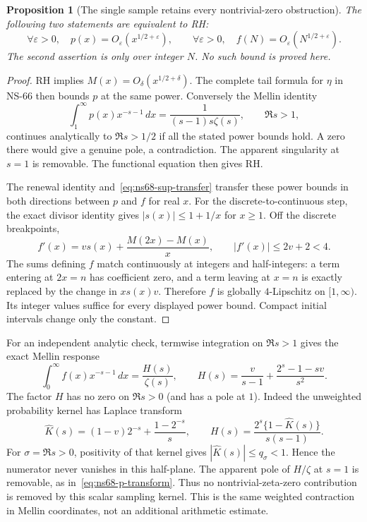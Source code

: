 \documentclass[11pt]{article}
\newtheorem{proposition}[theorem]{Proposition}
\theoremstyle{remark}
\begin{document}
\begin{proposition}[The single sample retains every nontrivial-zero obstruction]
\label{prop:ns68-scalar-criterion}
The following two statements are equivalent to RH:
\[
 \forall\varepsilon>0,\quad p(x)=O_\varepsilon(x^{1/2+\varepsilon}),
 \qquad
 \forall\varepsilon>0,\quad f(N)=O_\varepsilon(N^{1/2+\varepsilon}).
\]
The second assertion is only over integer $N$. No such bound is
proved here.
\end{proposition}
\begin{proof}
RH implies $M(x)=O_\delta(x^{1/2+\delta})$. The complete tail
formula for $\eta$ in NS-66 then bounds $p$ at the same power.
Conversely the Mellin identity
\begin{equation}
 \int_1^\infty p(x)x^{-s-1}\,dx
             =\frac1{(s-1)s\zeta(s)},\qquad \Re s>1,
 \label{eq:ns68-p-transform}
\end{equation}
continues analytically to $\Re s>1/2$ if all the stated power bounds
hold. A zero there would give a genuine pole, a contradiction.
The apparent singularity at $s=1$ is removable. The functional equation
then gives RH.

The renewal identity and~\eqref{eq:ns68-sup-transfer} transfer these
power bounds in both directions between $p$ and $f$ for real $x$.
For the discrete-to-continuous step, the exact divisor identity gives
$|s(x)|\leq1+1/x$ for $x\geq1$. Off the discrete breakpoints,
\[
 f'(x)=v s(x)+\frac{M(2x)-M(x)}x,
 \qquad |f'(x)|\leq2v+2<4.
\]
The sums defining $f$ match continuously at integers and half-integers:
a term entering at $2x=n$ has coefficient zero, and a term leaving
at $x=n$ is exactly replaced by the change in $xs(x)v$.
Therefore $f$ is globally $4$-Lipschitz on $[1,\infty)$.
Its integer values suffice for every displayed power bound. Compact
initial intervals change only the constant.
\end{proof}

For an independent analytic check, termwise integration on $\Re s>1$
gives the exact Mellin response
\begin{equation}
 \int_0^\infty f(x)x^{-s-1}\,dx
  =\frac{H(s)}{\zeta(s)},\qquad
 H(s)=\frac{v}{s-1}+\frac{2^s-1-sv}{s^2}.
 \label{eq:ns68-forcing-transform}
\end{equation}
The factor $H$ has no zero on $\Re s>0$ (and has a pole at $1$).
Indeed the unweighted probability kernel has Laplace transform
\[
 \widehat K(s)=(1-v)2^{-s}+\frac{1-2^{-s}}s,
 \qquad H(s)=\frac{2^s\{1-\widehat K(s)\}}{s(s-1)}.
\]
For $\sigma=\Re s>0$, positivity of that kernel gives
$|\widehat K(s)|\leq q_\sigma<1$. Hence the numerator never
vanishes in this half-plane. The apparent pole of $H/\zeta$ at
$s=1$ is removable, as in~\eqref{eq:ns68-p-transform}.
Thus no nontrivial-zeta-zero contribution is removed by this scalar
sampling kernel. This is the same weighted contraction in Mellin
coordinates, not an additional arithmetic estimate.
\end{document}
